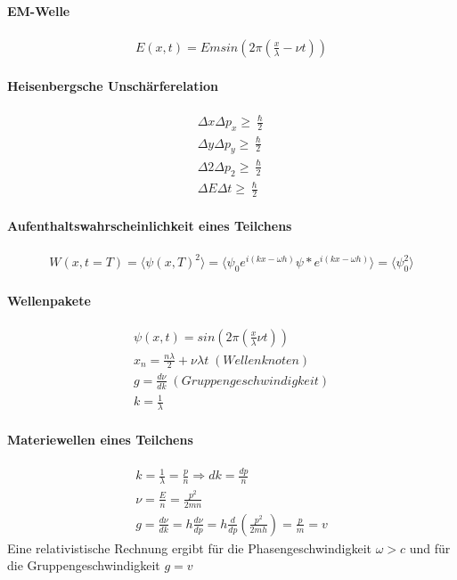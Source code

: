 \documentclass[10pt,a4paper]{article}
\begin{document}
\paragraph{EM-Welle}$\,$ \\
\begin{align}
E(x,t)= E m sin(2\pi(\frac{x}{\lambda}-\nu t))
\end{align}
\paragraph{Heisenbergsche Unschärferelation}$\,$ \\
\begin{align}
\Delta x \Delta p_x \geqslant \frac{\hslash}{2}\\
\Delta y \Delta p_y \geqslant \frac{\hslash}{2}\\
\Delta 2 \Delta p_2 \geqslant \frac{\hslash}{2}\\
\Delta E \Delta t \geqslant \frac{\hslash}{2}
\end{align}
\paragraph{Aufenthaltswahrscheinlichkeit eines Teilchens}$\,$ \\
\begin{align}
W(x,t=T)=\langle \psi(x,T)^2 \rangle = \langle\psi_0 e^{i(kx-\omega h)}\psi * e^{i(kx-\omega h)} \rangle = \langle \psi_0^2 \rangle 
\end{align}
\paragraph{Wellenpakete}$\,$ \\
\begin{align}
\psi(x,t)=sin(2\pi(\frac{x}{\lambda} \nu t))\\
x_n = \frac{n\lambda}{2}+\nu \lambda t \; (Wellenknoten)\\
g=\frac{d\nu}{d k} \; (Gruppengeschwindigkeit)\\
k=\frac{1}{\lambda}
\end{align}
\paragraph{Materiewellen eines Teilchens}$\,$ \\
\begin{align}
k=\frac{1}{\lambda}=\frac{p}{n} \Rightarrow dk = \frac{dp}{n}\\
\nu = \frac{E}{n} = \frac{p^2}{2mn}\\
g = \frac{d\nu}{dk} = h\frac{d\nu}{dp}=h \frac{d}{dp}\left(\frac{p^2}{2mh}\right)= \frac{p}{m}=v
\end{align}
Eine relativistische Rechnung ergibt für die Phasengeschwindigkeit $\omega > c $ und für die Gruppengeschwindigkeit $g=v$\\
\end{document}
